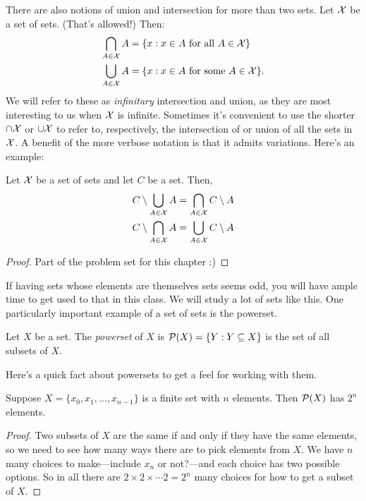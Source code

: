 \documentclass[10pt]{amsart}
\begin{document}
There are also notions of union and intersection for more than two sets. Let $\mathcal{X}$ be a set of sets. (That's allowed!) Then:
\begin{align*}
\bigcap_{A \in \mathcal{X}} A &= \{ x : x \in A \text{ for all } A \in \mathcal{X} \} \\
\bigcup_{A \in \mathcal{X}} A &=\{ x : x \in A \text{ for some } A \in \mathcal{X} \}.
\end{align*}
We will refer to these as \emph{infinitary} intersection and union, as they are most interesting to us when $\mathcal{X}$ is infinite.
Sometimes it's convenient to use the shorter $\cap \mathcal{X}$ or $\cup \mathcal{X}$ to refer to, respectively, the intersection of or union of all the sets in $\mathcal{X}$. A benefit of the more verbose notation is that it admits variations. Here's an example:

\begin{proposition*}
Let $\mathcal{X}$ be a set of sets and let $C$ be a set. Then,
\begin{align*}
C \setminus \bigcup_{A \in \mathcal{X}} A &= \bigcap_{A \in \mathcal{X}} C \setminus A \\
C \setminus \bigcap_{A \in \mathcal{X}} A &= \bigcup_{A \in \mathcal{X}} C \setminus A \\
\end{align*}
\end{proposition*}

\begin{proof}
Part of the problem set for this chapter :)
\end{proof}

If having sets whose elements are themselves sets seems odd, you will have ample time to get used to that in this class. We will study a lot of sets like this. One particularly important example of a set of sets is the powerset.

\begin{definition}
Let $X$ be a set. The \emph{powerset} of $X$ is $\mathcal{P}(X) = \{ Y : Y \subseteq X \}$ is the set of all subsets of $X$.
\end{definition}

Here's a quick fact about powersets to get a feel for working with them.

\begin{proposition}
Suppose $X = \{ x_0, x_1, \ldots, x_{n-1}\}$ is a finite set with $n$ elements. Then $\mathcal{P}(X)$ has $2^n$ elements.
\end{proposition}

\begin{proof}
Two subsets of $X$ are the same if and only if they have the same elements, so we need to see how many ways there are to pick elements from $X$. We have $n$ many choices to make---include $x_n$ or not?---and each choice has two possible options. So in all there are $2 \times 2 \times \cdots 2 = 2^n$ many choices for how to get a subset of $X$.
\end{proof}
\end{document}

